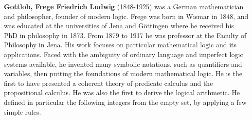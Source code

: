 \textbf{Gottlob, Frege Friedrich Ludwig} (1848-1925) was a German mathematician and philosopher, founder of modern logic. Frege was born in Wismar in 1848, and was educated at the universities of Jena and Göttingen where he received his PhD in philosophy in 1873. From 1879 to 1917 he was professor at the Faculty of Philosophy in Jena. His work focuses on particular mathematical logic and its applications. Faced with the ambiguity of ordinary language and imperfect logic systems available, he invented many symbolic notations, such as quantifiers and variables, then putting the foundations of modern mathematical logic. He is the first to have presented a coherent theory of predicate calculus and the propositional calculus. He was also the first to derive the logical arithmetic. He defined in particular the following integers from the empty set, by applying a few simple rules.

